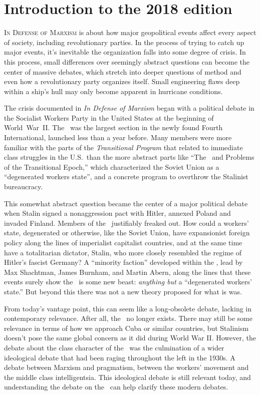 \chapter{Introduction to the 2018 edition}

\textsc{In Defense of Marxism} is about how major geopolitical events affect every aspect of society, including revolutionary parties. In the process of trying to catch up major events, it’s inevitable the organization falls into some degree of crisis. In this process, small differences over seemingly abstract questions can become the center of massive debates, which stretch into deeper questions of method and even how a revolutionary party organizes itself. Small engineering flaws deep within a ship’s hull may only become apparent in hurricane conditions.

The crisis documented in \emph{In Defense of Marxism} began with a political debate in the Socialist Workers Party in the United States at the beginning of World~War~II. The \SWP\ was the largest section in the newly found Fourth International, launched less than a year before. Many members were more familiar with the parts of the \emph{Transitional Program} that related to immediate class struggles in the U.S.\ than the more abstract parts like ``The \USSR\ and Problems of the Transitional Epoch,'' which characterized the Soviet Union as a “degenerated workers state”, and a concrete program to overthrow the Stalinist bureaucracy.

This somewhat abstract question became the center of a major political debate when Stalin signed a nonaggression pact with Hitler, annexed Poland and invaded Finland. Members of the \SWP\ justifiably freaked out. How could a workers’ state, degenerated or otherwise, like the Soviet Union, have expansionist foreign policy along the lines of imperialist capitalist countries, and at the same time have a totalitarian dictator, Stalin, who more closely resembled the regime of Hitler’s fascist Germany? A “minority faction” developed within the \SWP, lead by Max Shachtman, James Burnham, and Martin Abern, along the lines that these events surely show the \USSR\ is some new beast: \emph{anything but} a “degenerated workers’ state.” But beyond this there was not a new theory proposed for what is was.

From today’s vantage point, this can seem like a long-obsolete debate, lacking in contemporary relevance. After all, the \USSR\ no longer exists. There may still be some relevance in terms of how we approach Cuba or similar countries, but Stalinism doesn’t pose the same global concern as it did during World War II. However, the debate about the class character of the \USSR\ was the culmination of a wider ideological debate that had been raging throughout the left in the 1930s. A debate between Marxism and pragmatism, between the workers’ movement and the middle class intelligentsia. This ideological debate is still relevant today, and understanding the debate on the \USSR\ can help clarify these modern debates.
\noclub

